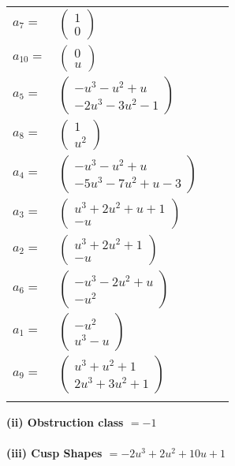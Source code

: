 \documentclass[1p]{elsarticle_modified}
\theoremstyle{definition}
\begin{document}
\begin{tabular}{m{7pt} m{180pt} m{7pt} m{180pt} }
\flushright $a_{7}=$&$\begin{pmatrix}1\\0\end{pmatrix}$ \\
\flushright $a_{10}=$&$\begin{pmatrix}0\\u\end{pmatrix}$ \\
\flushright $a_{5}=$&$\begin{pmatrix}- u^3- u^2+u\\-2 u^3-3 u^2-1\end{pmatrix}$ \\
\flushright $a_{8}=$&$\begin{pmatrix}1\\u^2\end{pmatrix}$ \\
\flushright $a_{4}=$&$\begin{pmatrix}- u^3- u^2+u\\-5 u^3-7 u^2+u-3\end{pmatrix}$ \\
\flushright $a_{3}=$&$\begin{pmatrix}u^3+2 u^2+u+1\\- u\end{pmatrix}$ \\
\flushright $a_{2}=$&$\begin{pmatrix}u^3+2 u^2+1\\- u\end{pmatrix}$ \\
\flushright $a_{6}=$&$\begin{pmatrix}- u^3-2 u^2+u\\- u^2\end{pmatrix}$ \\
\flushright $a_{1}=$&$\begin{pmatrix}- u^2\\u^3- u\end{pmatrix}$ \\
\flushright $a_{9}=$&$\begin{pmatrix}u^3+u^2+1\\2 u^3+3 u^2+1\end{pmatrix}$\\&\end{tabular}
\flushleft \textbf{(ii) Obstruction class $= -1$}\\~\\
\flushleft \textbf{(iii) Cusp Shapes $= -2 u^3+2 u^2+10 u+1$}\\~\\
\end{document}
